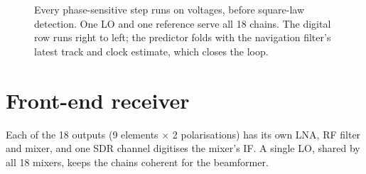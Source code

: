 \documentclass[11pt,a4paper]{article}
\begin{document}
\begin{figure}[ht]
\caption{Every phase-sensitive step runs on voltages, before square-law detection. One LO and one
reference serve all 18 chains. The digital row runs right to left; the predictor folds with the
navigation filter's latest track and clock estimate, which closes the loop.}
\label{fig:chain}
\end{figure}

\section{Front-end receiver}

Each of the 18 outputs (9 elements $\times$ 2 polarisations) has its own LNA, RF filter and mixer, and
one SDR channel digitises the mixer's IF. A single LO, shared by all 18 mixers, keeps the chains
coherent for the beamformer.
\end{document}

